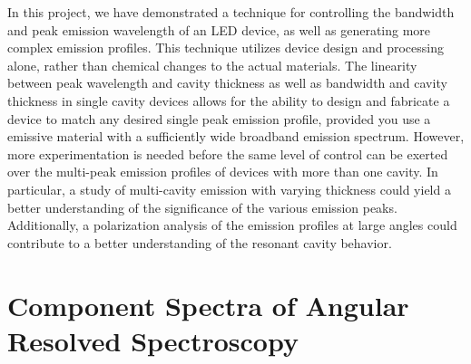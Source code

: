 \documentclass{report}
\begin{document}
    In this project, we have demonstrated a technique for controlling the bandwidth and peak emission wavelength of an LED device, as well as generating more complex emission profiles. This technique utilizes device design and processing alone, rather than chemical changes to the actual materials. The linearity between peak wavelength and cavity thickness as well as bandwidth and cavity thickness in single cavity devices allows for the ability to design and fabricate a device to match any desired single peak emission profile, provided you use a emissive material with a sufficiently wide broadband emission spectrum. However, more experimentation is needed before the same level of control can be exerted over the multi-peak emission profiles of devices with more than one cavity. In particular, a study of multi-cavity emission with varying thickness could yield a better understanding of the significance of the various emission peaks. Additionally, a polarization analysis of the emission profiles at large angles could contribute to a better understanding of the resonant cavity behavior.

\appendix
\chapter{Component Spectra of Angular Resolved Spectroscopy}
\end{document}
